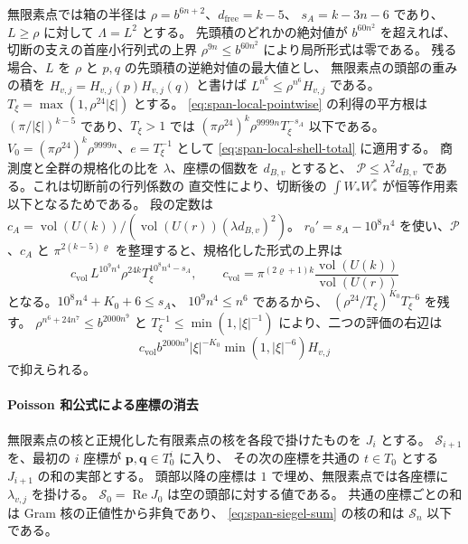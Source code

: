 無限素点では箱の半径は \(\rho=b^{6n+2}\)、\(d_{\mathrm{free}}=k-5\)、
\(s_A=k-3n-6\) であり、\(L\ge\rho\) に対して \(\Lambda=L^2\) とする。
先頭積のどれかの絶対値が \(b^{60n^2}\) を超えれば、
切断の支えの首座小行列式の上界 \(\rho^{9n}\le b^{60n^2}\) により局所形式は零である。
残る場合、\(L\) を \(\rho\) と \(p,q\) の先頭積の逆絶対値の最大値とし、
無限素点の頭部の重みの積を \(H_{v,j}=H_{v,j}(p)H_{v,j}(q)\) と書けば
\(L^{n^6}\le \rho^{n^6}H_{v,j}\) である。
\(T_\xi=\max(1,\rho^{24}|\xi|)\) とする。
\eqref{eq:span-local-pointwise} の利得の平方根は
\((\pi/|\xi|)^{k-5}\) であり、\(T_\xi>1\) では
\((\pi\rho^{24})^k\rho^{9999n}T_\xi^{-s_A}\) 以下である。
\(V_0=(\pi\rho^{24})^k\rho^{9999n}\)、\(e=T_\xi^{-1}\) として
\eqref{eq:span-local-shell-total} に適用する。
商測度と全群の規格化の比を \(\lambda\)、座標の個数を \(d_{B,v}\) とすると、
\(\mathcal P\le\lambda^2 d_{B,v}\) である。これは切断前の行列係数の
直交性により、切断後の \(\int W_\ast W_\ast^*\) が恒等作用素以下となるためである。
段の定数は
\(c_A=\operatorname{vol}(U(k))/(\operatorname{vol}(U(r))(\lambda d_{B,v})^2)\)。
\(r_0'=s_A-10^8n^4\) を使い、\(\mathcal P\)、\(c_A\) と
\(\pi^{2(k-5)\varrho}\) を整理すると、規格化した形式の上界は
\[
 c_{\mathrm{vol}}\,L^{10^9n^4}\rho^{24k}
            T_\xi^{10^8n^4-s_A},\qquad
 c_{\mathrm{vol}}=\pi^{(2\varrho+1)k}
                     \frac{\operatorname{vol}(U(k))}{\operatorname{vol}(U(r))}
\]
となる。\(10^8n^4+K_0+6\le s_A\)、
\(10^9n^4\le n^6\) であるから、
\((\rho^{24}/T_\xi)^{K_0}T_\xi^{-6}\) を残す。
\(\rho^{n^6+24n^7}\le b^{2000n^9}\) と
\(T_\xi^{-1}\le\min(1,|\xi|^{-1})\) により、二つの評価の右辺は
\begin{equation}\label{eq:span-arch-decay}
 c_{\mathrm{vol}}b^{2000n^9}|\xi|^{-K_0}
                     \min(1,|\xi|^{-6})H_{v,j}
\end{equation}
で抑えられる。

\paragraph{Poisson 和公式による座標の消去}
無限素点の核と正規化した有限素点の核を各段で掛けたものを \(J_i\) とする。
\(\mathcal S_{i+1}\) を、最初の \(i\) 座標が \(\mathbf p,\mathbf q\in T_0^i\) に入り、
その次の座標を共通の \(t\in T_0\) とする \(J_{i+1}\) の和の実部とする。
頭部以降の座標は \(1\) で埋め、無限素点では各座標に \(\lambda_{v,j}\) を掛ける。
\(\mathcal S_0=\operatorname{Re}J_0\) は空の頭部に対する値である。
共通の座標ごとの和は Gram 核の正値性から非負であり、
\eqref{eq:span-siegel-sum} の核の和は \(\mathcal S_n\) 以下である。

